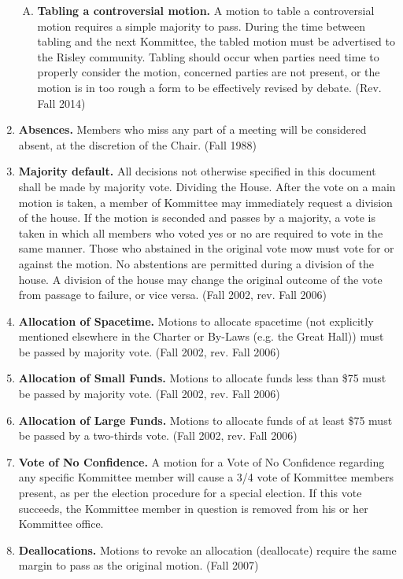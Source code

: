 \documentclass[12pt]{article}
\begin{document}
\begin{enumerate}[1.]
\begin{enumerate}[A.]
\item \textbf{Tabling a controversial motion.} A motion to table a controversial motion requires a simple majority to pass. During the time between tabling and the next Kommittee, the tabled motion must be advertised to the Risley community. Tabling should occur when parties need time to properly consider the motion, concerned parties are not present, or the motion is in too rough a form to be effectively revised by debate. (Rev. Fall 2014)
\end{enumerate}
\item \textbf{Absences.} Members who miss any part of a meeting will be considered absent, at the discretion of the Chair. (Fall 1988)
\item \textbf{Majority default.} All decisions not otherwise specified in this document shall be made by majority vote.
Dividing the House. After the vote on a main motion is taken, a member of Kommittee may immediately request a division of the house. If the motion is seconded and passes by a majority, a vote is taken in which all members who voted yes or no are required to vote in the same manner. Those who abstained in the original vote mow must vote for or against the motion. No abstentions are permitted during a division of the house. A division of the house may change the original outcome of the vote from passage to failure, or vice versa. (Fall 2002, rev. Fall 2006)
\item \textbf{Allocation of Spacetime.} Motions to allocate spacetime (not explicitly mentioned elsewhere in the Charter or By-Laws (e.g. the Great Hall)) must be passed by majority vote. (Fall 2002, rev. Fall 2006)
\item \textbf{Allocation of Small Funds.} Motions to allocate funds less than \$75 must be passed by majority vote. (Fall 2002, rev. Fall 2006)
\item \textbf{Allocation of Large Funds.} Motions to allocate funds of at least \$75 must be passed by a two-thirds vote. (Fall 2002, rev. Fall 2006)
\item \textbf{Vote of No Confidence.} A motion for a Vote of No Confidence regarding any specific Kommittee member will cause a 3/4 vote of Kommittee members present, as per the election procedure for a special election. If this vote succeeds, the Kommittee member in question is removed from his or her Kommittee office.
\item \textbf{Deallocations.} Motions to revoke an allocation (deallocate) require the same margin to pass as the original motion. (Fall 2007)
\end{enumerate}
\end{document}
